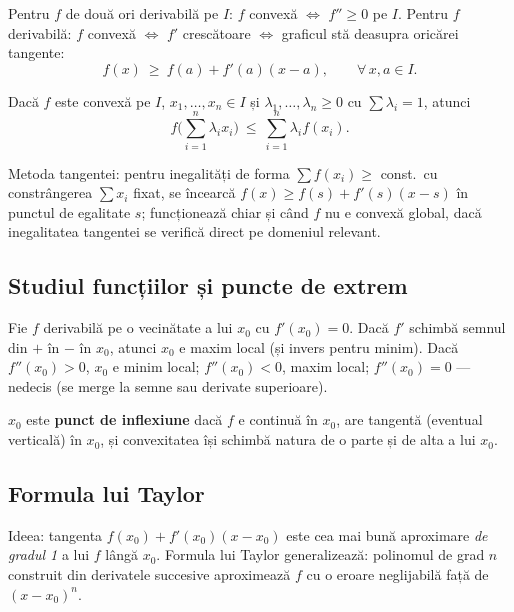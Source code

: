 \begin{teorema}
Pentru $f$ de două ori derivabilă pe $I$: $f$ convexă $\iff$ $f''\ge 0$ pe $I$. Pentru $f$ derivabilă: $f$ convexă $\iff$ $f'$ crescătoare $\iff$ graficul stă deasupra oricărei tangente:
\[
f(x)\ \ge\ f(a)+f'(a)(x-a),\qquad \forall\, x,a\in I.
\]
\end{teorema}

\begin{teorema}
Dacă $f$ este convexă pe $I$, $x_1,\dots,x_n\in I$ și $\lambda_1,\dots,\lambda_n\ge 0$ cu $\sum\lambda_i=1$, atunci
\[
f\Big(\sum_{i=1}^n \lambda_i x_i\Big)\ \le\ \sum_{i=1}^n \lambda_i f(x_i).
\]
\end{teorema}

\begin{obs}
Metoda tangentei: pentru inegalități de forma $\sum f(x_i)\ge$ const.\ cu constrângerea $\sum x_i$ fixat, se încearcă $f(x)\ge f(s)+f'(s)(x-s)$ în punctul de egalitate $s$; funcționează chiar și când $f$ nu e convexă global, dacă inegalitatea tangentei se verifică direct pe domeniul relevant.
\end{obs}

\subsection{Studiul funcțiilor și puncte de extrem}

\begin{propozitie}
Fie $f$ derivabilă pe o vecinătate a lui $x_0$ cu $f'(x_0)=0$. Dacă $f'$ schimbă semnul din $+$ în $-$ în $x_0$, atunci $x_0$ e maxim local (și invers pentru minim). Dacă $f''(x_0)>0$, $x_0$ e minim local; $f''(x_0)<0$, maxim local; $f''(x_0)=0$ --- nedecis (se merge la semne sau derivate superioare).
\end{propozitie}

\begin{definitie}
$x_0$ este \textbf{punct de inflexiune} dacă $f$ e continuă în $x_0$, are tangentă (eventual verticală) în $x_0$, și convexitatea își schimbă natura de o parte și de alta a lui $x_0$.
\end{definitie}

\subsection{Formula lui Taylor}

Ideea: tangenta $f(x_0)+f'(x_0)(x-x_0)$ este cea mai bună aproximare \emph{de gradul 1} a lui $f$ lângă $x_0$. Formula lui Taylor generalizează: polinomul de grad $n$ construit din derivatele succesive aproximează $f$ cu o eroare neglijabilă față de $(x-x_0)^n$.


